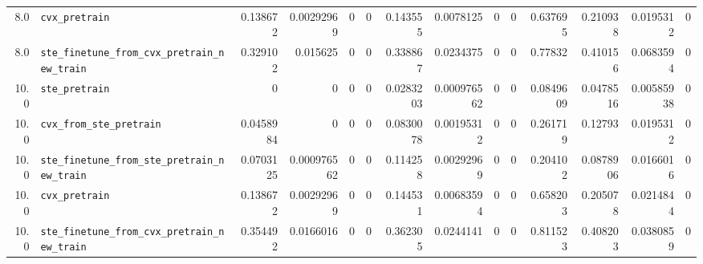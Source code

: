 \begin{longtable}{@{}r l *{12}{r}@{}}
8.0 & \texttt{cvx\_pretrain} & 0.138672 & 0.00292969 & 0 & 0 & 0.143555 & 0.0078125 & 0 & 0 & 0.637695 & 0.210938 & 0.0195312 & 0 \\
8.0 & \texttt{ste\_finetune\_from\_cvx\_pretrain\_new\_train} & 0.329102 & 0.015625 & 0 & 0 & 0.338867 & 0.0234375 & 0 & 0 & 0.77832 & 0.410156 & 0.0683594 & 0 \\
10.0 & \texttt{ste\_pretrain} & 0 & 0 & 0 & 0 & 0.0283203 & 0.000976562 & 0 & 0 & 0.0849609 & 0.0478516 & 0.00585938 & 0 \\
10.0 & \texttt{cvx\_from\_ste\_pretrain} & 0.0458984 & 0 & 0 & 0 & 0.0830078 & 0.00195312 & 0 & 0 & 0.261719 & 0.12793 & 0.0195312 & 0 \\
10.0 & \texttt{ste\_finetune\_from\_ste\_pretrain\_new\_train} & 0.0703125 & 0.000976562 & 0 & 0 & 0.114258 & 0.00292969 & 0 & 0 & 0.204102 & 0.0878906 & 0.0166016 & 0 \\
10.0 & \texttt{cvx\_pretrain} & 0.138672 & 0.00292969 & 0 & 0 & 0.144531 & 0.00683594 & 0 & 0 & 0.658203 & 0.205078 & 0.0214844 & 0 \\
10.0 & \texttt{ste\_finetune\_from\_cvx\_pretrain\_new\_train} & 0.354492 & 0.0166016 & 0 & 0 & 0.362305 & 0.0244141 & 0 & 0 & 0.811523 & 0.408203 & 0.0380859 & 0 \\
\end{longtable}


